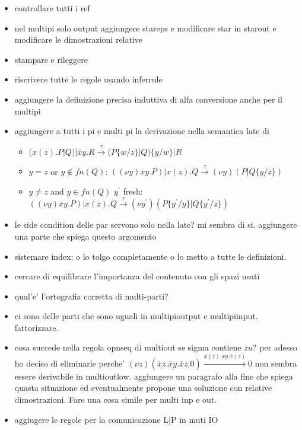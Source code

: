 \begin{itemize}
  \item 
    controllare tutti i ref
  \item 
    nel multipi solo output aggiungere stareps e modificare star in starout e modificare le dimostrazioni relative 
  \item 	
    stampare e rileggere
  \item
    riscrivere tutte le regole usando inferrule
  \item
    aggiungere la definizione precisa induttiva di alfa conversione anche per il multipi
  \item
    aggiungere a tutti i pi e multi pi la derivazione nella semantica late di
    \begin{itemize}
      \item 
	$(x(z).P|Q)|\overline{x}y.R \xrightarrow{\tau} (P\{w/z\}|Q)\{y/w\}|R$ 
      \item
	$y=z$ or $y\notin fn(Q)$: $((\nu y) \overline{x}y.P)| x(z).Q \xrightarrow{\tau} (\nu y)(P|Q\{y/z\})$
      \item
	$y\neq z$ and $y\in fn(Q)$  $y^{'}$ fresh: $((\nu y) \overline{x}y.P)| x(z).Q \xrightarrow{\tau} (\nu y^{'})(P\{y^{'}/y\}|Q\{y^{'}/z\})$
    \end{itemize}
  \item	
    le side condition delle par servono solo nella late? mi sembra di si. aggiungere una parte che spiega questo argomento
  \item
    sistemare index: o lo tolgo completamente o lo metto a tutte le definizioni.
  \item	
    cercare di equilibrare l'importanza del contenuto con gli spazi usati
  \item	
    qual'e' l'ortografia corretta di multi-parti?
  \item	
    ci sono delle parti che sono uguali in multipioutput e multipiinput. fattorizzare.
  \item	
    cosa succede nella regola opnseq di multiout se sigma contiene $\overline{z}u$? per adesso ho deciso di eliminarle perche' $(\nu z)(\underline{\overline{x}z}.\underline{\overline{x}y}.\overline{x}z.0) \xrightarrow{\overline{x}(z).\overline{x}y.\overline{x}(z)} 0$ non sembra essere derivabile in multioutlow. aggiungere un paragrafo alla fine che spiega quasta situazione ed eventualmente propone una soluzione con relative dimostrazioni. Fare una cosa simile per multi inp e out.
  \item
    aggiugere le regole per la comunicazione L|P in muti IO
\end{itemize}
